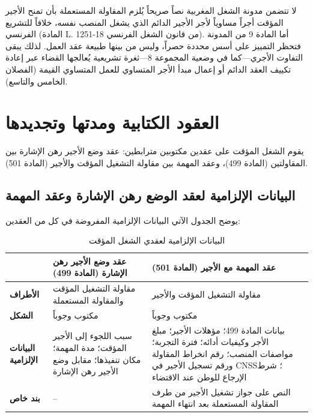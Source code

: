 \begin{tcolorbox}[colback=lightgray, colframe=maincolor, arc=4pt,
    title={\textbf{تنبيه تشريعي: مسألة المساواة في الأجر في المدونة}}]
لا تتضمن مدونة الشغل المغربية نصاً صريحاً يُلزم المقاولة المستعملة بأن تمنح الأجير المؤقت أجراً مساوياً لأجر الأجير الدائم الذي يشغل المنصب نفسه، خلافاً للتشريع الفرنسي (المادة \textfrench{L. 1251-18} من قانون الشغل الفرنسي). أما المادة \textenglish{9} من المدونة فتحظر التمييز على أسس محددة حصراً، وليس من بينها طبيعة عقد العمل. لذلك يبقى التفاوت الأجري—كما في وضعية المجموعة \textenglish{8}—ثغرة تشريعية يُعالجها القضاء عبر إعادة تكييف العقد الدائم أو إعمال مبدأ الأجر المتساوي للعمل المتساوي القيمة (الفصلان الخامس والتاسع).
\end{tcolorbox}

\section{العقود الكتابية ومدتها وتجديدها}

يقوم الشغل المؤقت على عقدين مكتوبين مترابطين: عقد وضع الأجير رهن الإشارة بين المقاولتين (المادة \textenglish{499})، وعقد المهمة بين مقاولة التشغيل المؤقت والأجير (المادة \textenglish{501}).

\subsection{البيانات الإلزامية لعقد الوضع رهن الإشارة وعقد المهمة}
يوضح الجدول الآتي البيانات الإلزامية المفروضة في كل من العقدين:

\begin{table}[htbp]
\centering
\small
\renewcommand{\arraystretch}{1.5}
\begin{tabular}{|p{3.2cm}|p{5.2cm}|p{5.2cm}|}
\hline
 & \textbf{عقد وضع الأجير رهن الإشارة (المادة \textenglish{499})} & \textbf{عقد المهمة مع الأجير (المادة \textenglish{501})} \\
\hline
\textbf{الأطراف} & مقاولة التشغيل المؤقت والمقاولة المستعملة & مقاولة التشغيل المؤقت والأجير \\
\hline
\textbf{الشكل} & مكتوب وجوباً & مكتوب وجوباً \\
\hline
\textbf{البيانات الإلزامية} & سبب اللجوء إلى الأجير المؤقت؛ مدة المهمة؛ مكان تنفيذها؛ مقابل وضع الأجير رهن الإشارة & بيانات المادة \textenglish{499}؛ مؤهلات الأجير؛ مبلغ الأجر وكيفيات أدائه؛ فترة التجربة؛ مواصفات المنصب؛ رقم انخراط المقاولة ورقم تسجيل الأجير في \textenglish{CNSS}؛ شرط الإرجاع للوطن عند الاقتضاء \\
\hline
\textbf{بند خاص} & -- & النص على جواز تشغيل الأجير من طرف المقاولة المستعملة بعد انتهاء المهمة \\
\hline
\end{tabular}
\caption{البيانات الإلزامية لعقدي الشغل المؤقت}
\label{tab:contrats-temporaire}
\end{table}

